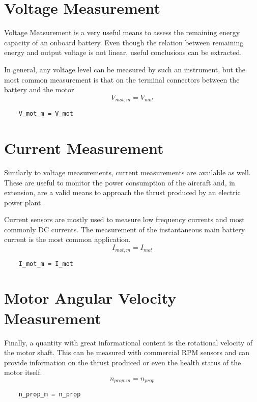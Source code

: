 \section{Voltage Measurement}
Voltage Measurement is a very useful means to assess the remaining energy capacity of an onboard battery. Even though the relation between remaining energy and output voltage is not linear, useful conclusions can be extracted.

In general, any voltage level can be measured by such an instrument, but the most common measurement is that on the terminal connectors between the battery and the motor
\begin{equation}
	V_{mot,m} = V_{mot}
\end{equation}
%
\begin{lstlisting}
	V_mot_m = V_mot
\end{lstlisting}

\section{Current Measurement}
Similarly to voltage measurements, current measurements are available as well. These are useful to monitor the power consumption of the aircraft and, in extension, are a valid means to approach the thrust produced by an electric power plant.

Current sensors are mostly used to measure low frequency currents and most commonly DC currents. The measurement of the instantaneous main battery current is the most common application.
%
\begin{equation}
	I_{mot,m} = I_{mot}
\end{equation}
%
\begin{lstlisting}
	I_mot_m = I_mot
\end{lstlisting}

\section{Motor Angular Velocity Measurement}
Finally, a quantity with great informational content is the rotational velocity of the motor shaft. This can be measured with commercial RPM sensors and can provide information on the thrust produced or even the health status of the motor itself.
\begin{equation}
	n_{prop,m} = n_{prop}
\end{equation}
\begin{lstlisting}
	n_prop_m = n_prop
\end{lstlisting}